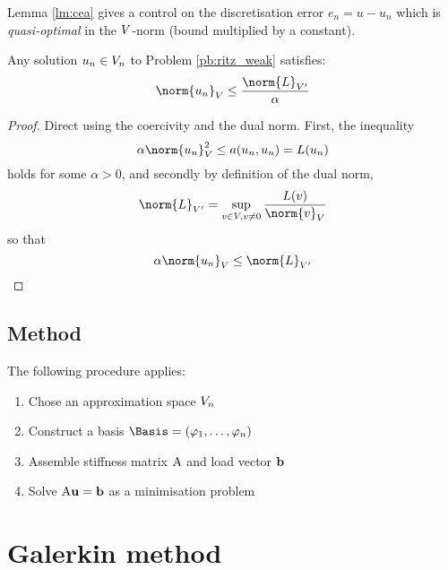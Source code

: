 Lemma \eqref{lm:cea} gives a control on the discretisation error $e_n = u - u_n$ which is \textit{quasi-optimal} in the ${V}$-norm (\ie bound multiplied by a constant).

\begin{lmm}[Stability]\label{lm:stability_elliptic}
Any solution $u_n \in {V}_n$ to Problem \eqref{pb:ritz_weak} satisfies:
\begin{equation*}
\norm{u_n}_\xV  \leq \dfrac{\norm{L}_{\xV'}}{\alpha}
\end{equation*}
\end{lmm}
\begin{proof}
Direct using the coercivity and the dual norm.
First, the inequality
\begin{equation*}
\alpha\norm{u_n}^2_\xV  \leq a(u_n, u_n) = L(u_n)
\end{equation*}
holds for some $\alpha > 0$, and secondly by definition of the dual norm,
\begin{equation*}
\norm{L}_{\xV'} = \sup_{v\in\xV, v\neq 0} \frac{L(v)}{\norm{v}_\xV}
\end{equation*}
so that
\begin{equation*}
\alpha\norm{u_n}_\xV  \leq \norm{L}_{\xV'}
\end{equation*}
\end{proof}

\subsection{Method}

\begin{lgrthm}\label{alg:ritz} The following procedure applies:
\begin{enumerate}
\item Chose an approximation space ${V}_n$
\item Construct a basis $\Basis= (\varphi_1,\dots,\varphi_n)$
\item Assemble stiffness matrix ${\mathrm A}$ and load vector $\mathbf b$
\item Solve ${\mathrm A} \mathbf u = \mathbf b$ as a minimisation problem
\end{enumerate}
\end{lgrthm}

\section{Galerkin method}

